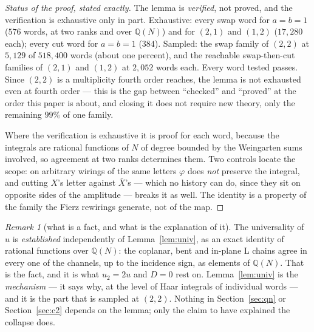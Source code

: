 \documentclass[11pt]{article}
\theoremstyle{definition}
\theoremstyle{remark}
\newtheorem{remark}[theorem]{Remark}
\newcommand{\Q}{\mathbb{Q}}
\newcommand{\chk}[1]{}
\begin{document}
\begin{proof}[Status of the proof, stated exactly]
The lemma is \emph{verified}, not proved, and the verification is exhaustive
only in part. Exhaustive: every swap word for $a=b=1$ ($576$ words, at two
ranks and over $\Q(N)$) and for $(2,1)$ and $(1,2)$ ($17{,}280$ each); every
cut word for $a=b=1$ ($384$). Sampled: the swap family of $(2,2)$ at
$5{,}129$ of $518{,}400$ words (about one percent), and the reachable
swap-then-cut families of $(2,1)$ and $(1,2)$ at $2{,}052$ words each. Every
word tested passes. Since $(2,2)$ is a multiplicity fourth order reaches, the
lemma is not exhausted even at fourth order --- this is the gap between
``checked'' and ``proved'' at the order this paper is about, and closing it
does not require new theory, only the remaining $99\%$ of one family.

Where the verification is exhaustive it is proof for each word, because the
integrals are rational functions of $N$ of degree bounded by the Weingarten
sums involved, so agreement at two ranks determines them. Two controls locate
the scope: on arbitrary wirings of the same letters $\varphi$ does \emph{not}
preserve the integral, and cutting $X$'s letter against $\bar X$'s --- which no
history can do, since they sit on opposite sides of the amplitude --- breaks it
as well. The identity is a property of the family the Fierz rewirings generate,
not of the map.\chk{the universality lemma, by exhaustion on the fourth-order family: phi (delete the second private letter of the straight middle face, keep the first as the weight-two link) maps every history's straight integrand onto its L integrand with the same coefficient, and preserves the Haar integral on every word the Fierz swaps and cuts can generate from the face words}
\end{proof}

\begin{remark}[what is a fact, and what is the explanation of it]\label{rem:factvsmech}
The universality of $u$ is \emph{established} independently of
Lemma~\ref{lem:univ}, as an exact identity of rational functions over $\Q(N)$:
the coplanar, bent and in-plane L chains agree in every one of the channels,
up to the incidence sign, as elements of $\Q(N)$. That is the fact, and it is
what $u_2=2u$ and $D=0$ rest on. Lemma~\ref{lem:univ} is the \emph{mechanism} ---
it says why, at the level of Haar integrals of individual words --- and it is
the part that is sampled at $(2,2)$. Nothing in Section~\ref{sec:qn} or
Section~\ref{sec:c2} depends on the lemma; only the claim to have explained the
collapse does.
\end{remark}
\end{document}
